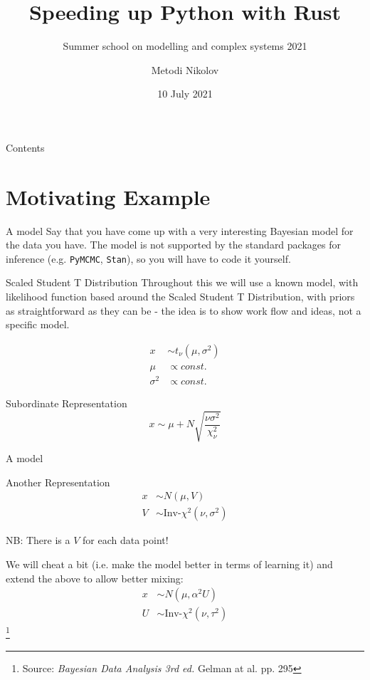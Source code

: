 \documentclass[8pt]{beamer}
\title{Speeding up Python with Rust}
\subtitle{Summer school on modelling and complex systems 2021}
\author{Metodi Nikolov}
\date{10 July 2021}
\newcommand\blfootnote[1]{%
	\begingroup
	\renewcommand\thefootnote{}\footnote{#1}%
	\addtocounter{footnote}{-1}%
	\endgroup
}
\begin{document}
\maketitle

\begin{frame}{Contents}
\tableofcontents
\end{frame}


\section{Motivating Example}
\begin{frame}{A model}
Say that you have come up with a very interesting Bayesian model for the data you have. The model is not supported by the standard packages for inference (e.g. \texttt{PyMCMC}, \texttt{Stan}), so you will have to code it yourself.

\pause
\begin{block}{Scaled Student T Distribution}
Throughout this we will use a known model, with likelihood function based around the Scaled Student T Distribution, with priors as straightforward as they can be - the idea is to show work flow and ideas, not a specific model.
\end{block}

\begin{align*}
x &\sim t_\nu(\mu, \sigma^2) \\
\mu &\propto const. \\
\sigma^2 &\propto const. 
\end{align*}

\pause
\begin{block}{Subordinate Representation}
	\[x \sim \mu + N\sqrt{\frac{\nu \sigma^2} {\chi^2_\nu}}\]
\end{block}
\end{frame}

\begin{frame}{A model}
\begin{block}{Another Representation}
	\begin{align*}
	x &\sim N(\mu, V) \\
	V &\sim \text{Inv-}\chi^2(\nu, \sigma^2)
	\end{align*}
\end{block}
\pause
NB: There is a $V$ for each data point!
\pause

We will cheat a bit (i.e. make the model better in terms of learning it) and extend the above to allow better mixing:
\begin{align*}
x &\sim N(\mu, \alpha^2U) \\
U &\sim \text{Inv-}\chi^2(\nu, \tau^2)
\end{align*}
\blfootnote{Source: \emph{Bayesian Data Analysis 3rd ed.} Gelman at al. pp. 295}
\end{frame}
\end{document}

